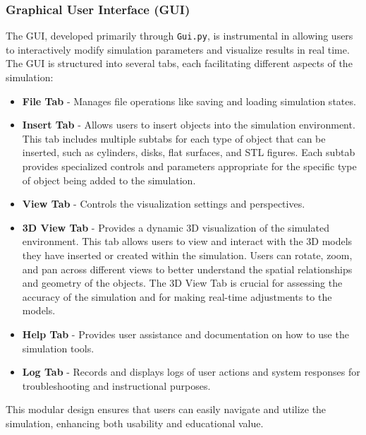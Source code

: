 \documentclass[../main.tex]{subfiles}
\begin{document}
\subsubsection{Graphical User Interface (GUI)}
The GUI, developed primarily through \texttt{Gui.py}, is instrumental in allowing users to interactively modify simulation parameters and visualize results in real time. The GUI is structured into several tabs, each facilitating different aspects of the simulation:
\begin{itemize}
    \item \textbf{File Tab} - Manages file operations like saving and loading simulation states.
    \item \textbf{Insert Tab} - Allows users to insert objects into the simulation environment. This tab includes multiple subtabs for each type of object that can be inserted, such as cylinders, disks, flat surfaces, and STL figures. Each subtab provides specialized controls and parameters appropriate for the specific type of object being added to the simulation.
    \item \textbf{View Tab} - Controls the visualization settings and perspectives.
    \item \textbf{3D View Tab} - Provides a dynamic 3D visualization of the simulated environment. This tab allows users to view and interact with the 3D models they have inserted or created within the simulation. Users can rotate, zoom, and pan across different views to better understand the spatial relationships and geometry of the objects. The 3D View Tab is crucial for assessing the accuracy of the simulation and for making real-time adjustments to the models.
    \item \textbf{Help Tab} - Provides user assistance and documentation on how to use the simulation tools.
    \item \textbf{Log Tab} - Records and displays logs of user actions and system responses for troubleshooting and instructional purposes.
\end{itemize}
This modular design ensures that users can easily navigate and utilize the simulation, enhancing both usability and educational value.
\end{document}
